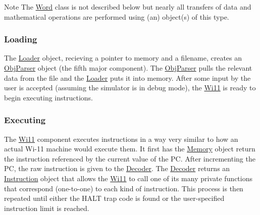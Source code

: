 \begin{DoxyNote}{Note}
The \hyperlink{classWord}{Word} class is not described below but nearly all transfers of data and mathematical operations are performed using (an) object(s) of this type.
\end{DoxyNote}
\hypertarget{index_loading}{}\subsubsection{Loading}\label{index_loading}
The \hyperlink{classLoader}{Loader} object, recieving a pointer to memory and a filename, creates an \hyperlink{classObjParser}{ObjParser} object (the fifth major component). The \hyperlink{classObjParser}{ObjParser} pulls the relevant data from the file and the \hyperlink{classLoader}{Loader} puts it into memory. After some input by the user is accepted (assuming the simulator is in debug mode), the \hyperlink{classWi11}{Wi11} is ready to begin executing instructions.\hypertarget{index_execution}{}\subsubsection{Executing}\label{index_execution}
The \hyperlink{classWi11}{Wi11} component executes instructions in a way very similar to how an actual Wi-\/11 machine would execute them. It first has the \hyperlink{classMemory}{Memory} object return the instruction referenced by the current value of the PC. After incrementing the PC, the raw instruction is given to the \hyperlink{classDecoder}{Decoder}. The \hyperlink{classDecoder}{Decoder} returns an \hyperlink{structInstruction}{Instruction} object that allows the \hyperlink{classWi11}{Wi11} to call one of its many private functions that correspond (one-\/to-\/one) to each kind of instruction. This process is then repeated until either the HALT trap code is found or the user-\/specified instruction limit is reached.


